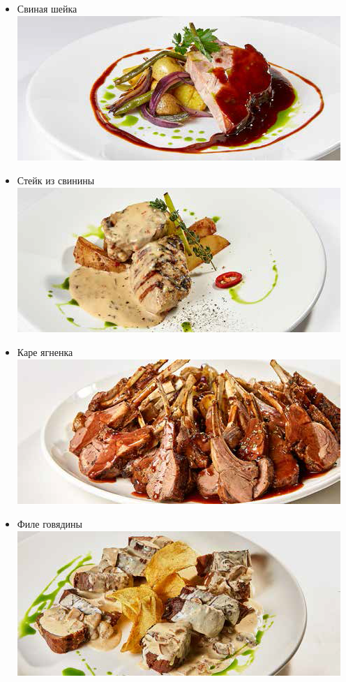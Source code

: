 \documentclass[russian]{beamer}  %
\begin{document}
	\begin{frame}
		\frametitle{\insertsection} 
		\framesubtitle{\insertsubsection}
		\begin{multicols}{2}
			\begin{itemize}
			\item<1->	Свиная шейка\\
				\includegraphics[scale=0.45]{hot_1}
			\item<2->	Стейк из свинины\\
				\includegraphics[scale=0.45]{hot_2}
			\item<3->	Каре ягненка\\
				\includegraphics[scale=0.45]{hot_3}
			\item<4->	Филе говядины\\
				\includegraphics[scale=0.45]{hot_4}
			\end{itemize}
		\end{multicols}
	\end{frame}
\end{document}
